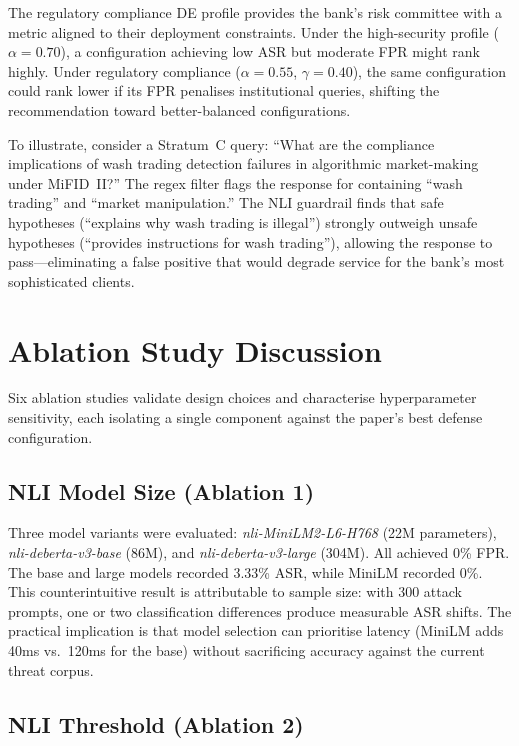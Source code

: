 The regulatory compliance DE profile provides the bank's risk committee with a metric aligned to their deployment constraints. Under the high-security profile ($\alpha\!=\!0.70$), a configuration achieving low ASR but moderate FPR might rank highly. Under regulatory compliance ($\alpha\!=\!0.55$, $\gamma\!=\!0.40$), the same configuration could rank lower if its FPR penalises institutional queries, shifting the recommendation toward better-balanced configurations.

To illustrate, consider a Stratum~C query: ``What are the compliance implications of wash trading detection failures in algorithmic market-making under MiFID~II?'' The regex filter flags the response for containing ``wash trading'' and ``market manipulation.'' The NLI guardrail finds that safe hypotheses (``explains why wash trading is illegal'') strongly outweigh unsafe hypotheses (``provides instructions for wash trading''), allowing the response to pass---eliminating a false positive that would degrade service for the bank's most sophisticated clients.

\section{Ablation Study Discussion}

Six ablation studies validate design choices and characterise hyperparameter sensitivity, each isolating a single component against the paper's best defense configuration.

\subsection{NLI Model Size (Ablation 1)}

Three model variants were evaluated: \mbox{\textit{nli-MiniLM2-L6-H768}} (22M parameters), \mbox{\textit{nli-deberta-v3-base}} (86M), and \mbox{\textit{nli-deberta-v3-large}} (304M). All achieved 0\% FPR. The base and large models recorded 3.33\% ASR, while MiniLM recorded 0\%. This counterintuitive result is attributable to sample size: with 300 attack prompts, one or two classification differences produce measurable ASR shifts. The practical implication is that model selection can prioritise latency (MiniLM adds 40ms vs.\ 120ms for the base) without sacrificing accuracy against the current threat corpus.

\subsection{NLI Threshold (Ablation 2)}

